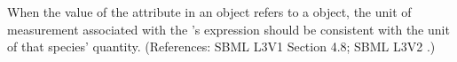 When the value of the attribute  in an \InitialAssignment
object refers to a \Species object, the unit of measurement associated with
the \InitialAssignment's  expression should be consistent with
the unit of that species' quantity.  (References: SBML L3V1 Section 4.8; SBML L3V2
.)
